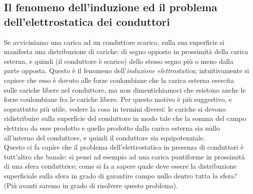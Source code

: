 \subsection{Il fenomeno dell'induzione ed il problema dell'elettrostatica dei
conduttori}

Se avviciniamo una carica ad un conduttore scarico, sulla sua superficie si
manifesta una distribuzione di cariche: di segno opposto in prossimit\`a della
carica esterna, e quindi (il conduttore \`e scarico) dello stesso segno pi\`u o
meno dalla parte opposta. Questo \`e il fenomeno dell'\emph{induzione
elettrostatica}; intuitivamente si capisce che esso \`e dovuto alle forze
coulombiane che la carica esterna esercita sulle cariche libere nel conduttore,
ma non dimentichiamoci che esistono anche le forze coulombiane fra le cariche
libere. Per questo motivo \`e pi\`u suggestivo, e soprattutto pi\`u utile,
vedere la cosa in termini diversi: le cariche si devono ridistribuire sulla
superficie del conduttore in modo tale che la somma del campo elettrico da esse
prodotto e quello prodotto dalla carica esterna sia nullo all'interno del
conduttore, e quindi il conduttore sia equipotenziale.\\
Questo ci fa capire che il problema dell'elettrostatica in presenza di
conduttori \`e tutt'altro che banale: si pensi ad esempio ad una carica
puntiforme in prossimit\`a di una sfera conduttrice; come si fa a sapere quale
deve essere la distribuzione superficiale sulla sfera in grado di garantire
campo nullo dentro tutta la sfera? (Pi\`u avanti saremo in grado di risolvere
questo problema).

